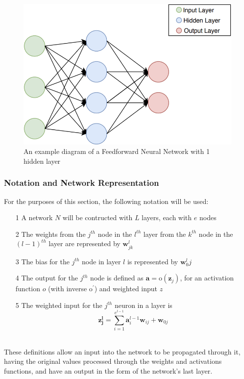 \documentclass[a4paper,11pt,oneside]{article}
\theoremstyle{plain}
\theoremstyle{definition}
\begin{document}
	\begin{figure}[H]
		\centering 
		\includegraphics[scale=0.5]{images/implementation/neural_network_diagram.png}
		\caption[Feedforward Neural Network Diagram]{An example diagram of a Feedforward Neural Network with 1 hidden layer}
		\label{figure-neural_network_diagram}
	\end{figure}		
	
	\subsubsection{Notation and Network Representation}\label{imp_ffn_functions}
	
	For the purposes of this section, the following notation will be used:
	
	\begin{itemize}
		\item[1] A network $N$ will be contructed with $L$ layers, each with $e$ nodes
		\item[2] The weights from the $j^{th}$ node in the $l^{th}$ layer from the $k^{th}$ node in the $(l-1)^{th}$ layer are represented by $\mathbf{w}^l_{jk}$
		\item[3] The bias for the $j^{th}$ node in layer $l$ is represented by $\mathbf{w}^l_0j$
		\item[4] The output for the $j^{th}$ node is defined as $\mathbf{a} = \mathrm{o}(\mathbf{z}_j)$, for an activation function $o$ (with inverse $\mathrm{o^{\prime}}$) and weighted input $z$
		\item[5] The weighted input for the $j^{th}$ neuron in a layer is 
		\begin{equation}\label{eq_weighted_input}
		\mathbf{z^l_j}=\sum_{i=1}^{e^{l-1}}{\mathbf{a}^{l-1}_i\mathbf{w}_{ij}} + \mathbf{w}_{0j}
		\end{equation}
	\end{itemize}
	~\\
	These definitions allow an input into the network to be propagated through it, having the original values processed through the weights and activations functions, and have an output in the form of the network's last layer.
	
\end{document}
